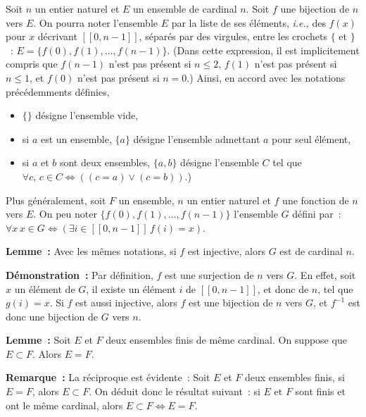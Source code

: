 Soit $n$ un entier naturel et $E$ un ensemble de cardinal $n$. 
Soit $f$ une bijection de $n$ vers $E$. 
On pourra noter l'ensemble $E$ par la liste de ses éléments, \textit{i.e.}, des $f(x)$ pour $x$ décrivant $[\![0, n-1]\!]$, séparés par des virgules, entre les crochets $\lbrace$ et $\rbrace$ : $E = \lbrace f(0), f(1), \dots, f(n-1) \rbrace$. 
(Dans cette expression, il est implicitement compris que $f(n-1)$ n'est pas présent si $n \leq 2$, $f(1)$ n'est pas présent si $n \leq 1$, et $f(0)$ n'est pas présent si $n = 0$.) 
Ainsi, en accord avec les notations précédemments définies, 
\begin{itemize}[nosep]
    \item $\lbrace \rbrace$ désigne l'ensemble vide,
    \item si $a$ est un ensemble, $\lbrace a \rbrace$ désigne l'ensemble admettant $a$ pour seul élément,
    \item si $a$ et $b$ sont deux ensembles, $\lbrace a, b \rbrace$ désigne l'ensemble $C$ tel que $\forall c, \, c \in C \Leftrightarrow ((c = a) \vee (c = b))$.)
\end{itemize}
Plus généralement, soit $F$ un ensemble, $n$ un entier naturel et $f$ une fonction de $n$ vers $E$. 
On peu noter $\lbrace f(0), f(1), \dots, f(n-1) \rbrace$ l'ensemble $G$ défini par : $\forall x \, x \in G \Leftrightarrow (\exists i \in [\![0, n-1]\!] \, f(i) = x)$.

\medskip

\noindent\textbf{Lemme :} Avec les mêmes notations, si $f$ est injective, alors $G$ est de cardinal $n$.

\medskip

\noindent\textbf{Démonstration :}
    Par définition, $f$ est une surjection de $n$ vers $G$. 
    En effet, soit $x$ un élément de $G$, il existe un élément $i$ de $[\![0, n-1]\!]$, et donc de $n$, tel que $g(i) = x$. 
    Si $f$ est aussi injective, alors $f$ est une bijection de $n$ vers $G$, et $f^{-1}$ est donc une bijection de $G$ vers $n$.

\done

\medskip

\noindent\textbf{Lemme :} Soit $E$ et $F$ deux ensembles finis de même cardinal. 
    On suppose que $E \subset F$. 
    Alors $E = F$. 

\medskip

\noindent\textbf{Remarque :} La réciproque est évidente : Soit $E$ et $F$ deux ensembles finis, si $E = F$, alors $E \subset F$. 
    On déduit donc le résultat suivant : si $E$ et $F$ sont finis et ont le même cardinal, alors $E \subset F \Leftrightarrow E = F$.

